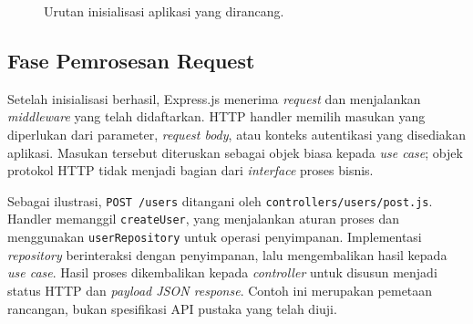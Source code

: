 \documentclass[12pt,a4paper,oneside]{report}
\begin{document}
\begin{figure}[!htbp]
\centering
\begin{singlespace}
\end{singlespace}
\caption{Urutan inisialisasi aplikasi yang dirancang.}
\label{fig:inisialisasi_uguided}
\end{figure}
\FloatBarrier

\subsection{Fase Pemrosesan Request}
Setelah inisialisasi berhasil, Express.js menerima \textit{request} dan menjalankan \textit{middleware} yang telah didaftarkan. HTTP handler memilih masukan yang diperlukan dari parameter, \textit{request body}, atau konteks autentikasi yang disediakan aplikasi. Masukan tersebut diteruskan sebagai objek biasa kepada \textit{use case}; objek protokol HTTP tidak menjadi bagian dari \textit{interface} proses bisnis.

Sebagai ilustrasi, \texttt{POST /\allowbreak users} ditangani oleh \texttt{controllers/\allowbreak users/\allowbreak post.js}. Handler memanggil \texttt{createUser}, yang menjalankan aturan proses dan menggunakan \texttt{userRepository} untuk operasi penyimpanan. Implementasi \textit{repository} berinteraksi dengan penyimpanan, lalu mengembalikan hasil kepada \textit{use case}. Hasil proses dikembalikan kepada \textit{controller} untuk disusun menjadi status HTTP dan \textit{payload JSON response}. Contoh ini merupakan pemetaan rancangan, bukan spesifikasi API pustaka yang telah diuji.
\end{document}
